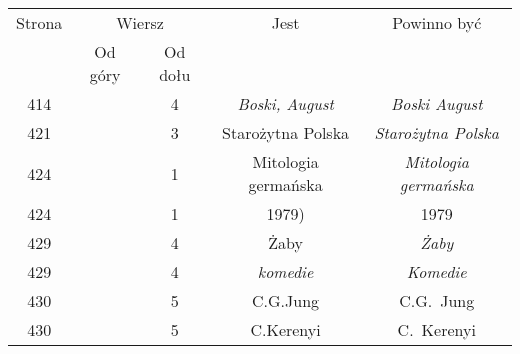 \documentclass[a4paper,11pt]{article}
\begin{document}
\begin{center}
  \begin{tabular}{|c|c|c|c|c|}
    \hline
    Strona & \multicolumn{2}{c|}{Wiersz} & Jest
                              & Powinno być \\ \cline{2-3}
    & Od góry & Od dołu & & \\
    \hline
    414 & & \hphantom{0}4 & \textit{Boski, August}
    & \textit{Boski August} \\
    421 & & \hphantom{0}3 & Starożytna Polska
    & \textit{Starożytna Polska} \\
    424 & & \hphantom{0}1 & Mitologia germańska
    & \textit{Mitologia germańska} \\
    424 & & \hphantom{0}1 & 1979) & 1979 \\
    429 & & \hphantom{0}4 & Żaby & \textit{Żaby} \\
    429 & & \hphantom{0}4 & \textit{komedie} & \textit{Komedie} \\
    430 & & \hphantom{0}5 & C.G.Jung & C.G.~Jung \\
    430 & & \hphantom{0}5 & C.Kerenyi & C.~Kerenyi \\
    \hline
  \end{tabular}






\end{center}
\end{document}
